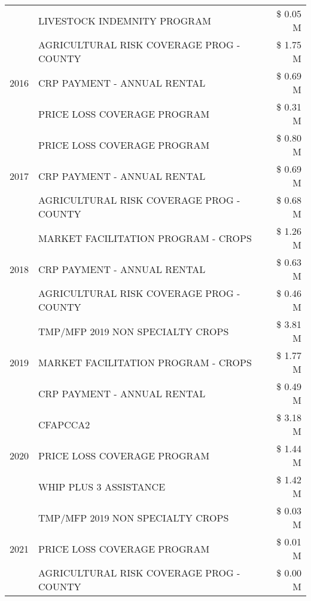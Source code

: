 \begin{tabular}{llr}
 & LIVESTOCK INDEMNITY PROGRAM & \$ 0.05 M \\
\cline{1-3}
\multirow[t]{3}{*}{2016} & AGRICULTURAL RISK COVERAGE PROG - COUNTY & \$ 1.75 M \\
 & CRP PAYMENT - ANNUAL RENTAL & \$ 0.69 M \\
 & PRICE LOSS COVERAGE PROGRAM & \$ 0.31 M \\
\cline{1-3}
\multirow[t]{3}{*}{2017} & PRICE LOSS COVERAGE PROGRAM & \$ 0.80 M \\
 & CRP PAYMENT - ANNUAL RENTAL & \$ 0.69 M \\
 & AGRICULTURAL RISK COVERAGE PROG - COUNTY & \$ 0.68 M \\
\cline{1-3}
\multirow[t]{3}{*}{2018} & MARKET FACILITATION PROGRAM - CROPS & \$ 1.26 M \\
 & CRP PAYMENT - ANNUAL RENTAL & \$ 0.63 M \\
 & AGRICULTURAL RISK COVERAGE PROG - COUNTY & \$ 0.46 M \\
\cline{1-3}
\multirow[t]{3}{*}{2019} & TMP/MFP 2019 NON SPECIALTY CROPS & \$ 3.81 M \\
 & MARKET FACILITATION PROGRAM - CROPS & \$ 1.77 M \\
 & CRP PAYMENT - ANNUAL RENTAL & \$ 0.49 M \\
\cline{1-3}
\multirow[t]{3}{*}{2020} & CFAPCCA2 & \$ 3.18 M \\
 & PRICE LOSS COVERAGE PROGRAM & \$ 1.44 M \\
 & WHIP PLUS 3 ASSISTANCE & \$ 1.42 M \\
\cline{1-3}
\multirow[t]{3}{*}{2021} & TMP/MFP 2019 NON SPECIALTY CROPS & \$ 0.03 M \\
 & PRICE LOSS COVERAGE PROGRAM & \$ 0.01 M \\
 & AGRICULTURAL RISK COVERAGE PROG - COUNTY & \$ 0.00 M \\
\cline{1-3}
\bottomrule
\end{tabular}
